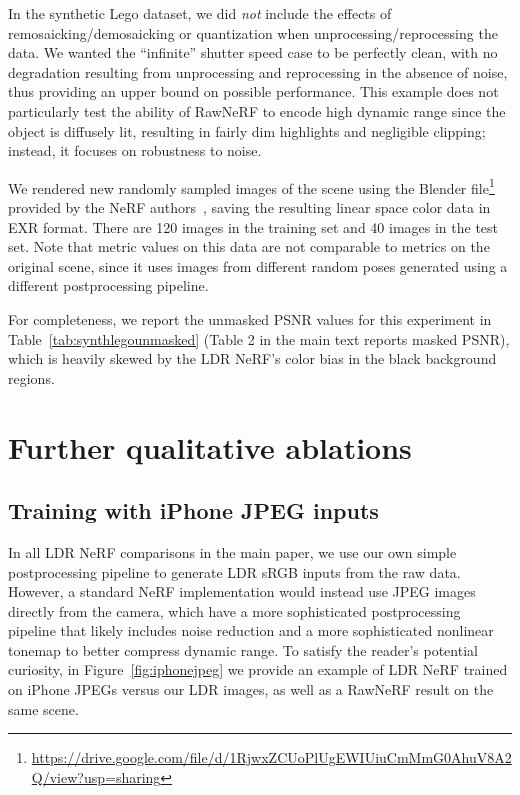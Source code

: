 In the synthetic Lego dataset, we did \emph{not} include the effects of remosaicking/demosaicking or quantization when unprocessing/reprocessing the data. We wanted the ``infinite'' shutter speed case to be perfectly clean, with no degradation resulting from unprocessing and reprocessing in the absence of noise, thus providing an upper bound on possible performance. This example does not particularly test the ability of RawNeRF to encode high dynamic range since the object is diffusely lit, resulting in fairly dim highlights and negligible clipping; instead, it focuses on robustness to noise.

We rendered new randomly sampled images of the scene using the Blender file\footnote{\url{https://drive.google.com/file/d/1RjwxZCUoPlUgEWIUiuCmMmG0AhuV8A2Q/view?usp=sharing}} provided by the NeRF authors~\cite{mildenhall2020nerf}, saving the resulting linear space color data in EXR format. There are 120 images in the training set and 40 images in the test set. Note that metric values on this data are not comparable to metrics on the original scene, since it uses images from different random poses generated using a different postprocessing pipeline.

For completeness, we report the unmasked PSNR values for this experiment in Table~\ref{tab:synthlegounmasked} (Table 2 in the main text reports masked PSNR), which is heavily skewed by the LDR NeRF's color bias in the black background regions.



\section{Further qualitative ablations}

\subsection{Training with iPhone JPEG inputs}

In all LDR NeRF comparisons in the main paper, we use our own simple postprocessing pipeline to generate LDR sRGB inputs from the raw data. However, a standard NeRF implementation would instead use JPEG images directly from the camera, which have a more sophisticated postprocessing pipeline that likely includes noise reduction and a more sophisticated nonlinear tonemap to better compress dynamic range. To satisfy the reader's potential curiosity, in Figure~\ref{fig:iphonejpeg} we provide an example of LDR NeRF trained on iPhone JPEGs versus our LDR images, as well as a RawNeRF result on the same scene.

